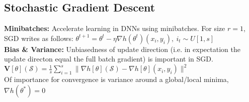 \subsection{Stochastic Gradient Descent}
\textbf{ Minibatches:}
Accelerate learning in DNNs using minibatches. For size $r=1$, SGD writes as follows:
$\theta^{t+1} = \theta^{t} - \eta \nabla h(\theta^{t})(x_{i}, y_{i}), \ i_{t} \sim U[1,s]$\\
\textbf{Bias \& Variance:}
Unbiasedness of update direction (i.e. in expectation the update directon equal the full batch gradient) is important in SGD.\\
$\mathbf{V}[\theta](\mathcal{S}) = \frac{1}{s} \sum_{i=1}^{s} \lVert \nabla h[\theta](\mathcal{S}) - \nabla h[\theta] (x_{i}, y_{i}) \rVert ^{2}$\\
Of importance for convergence is variance around a global/local minima, $\nabla h(\theta^{\ast})=0$